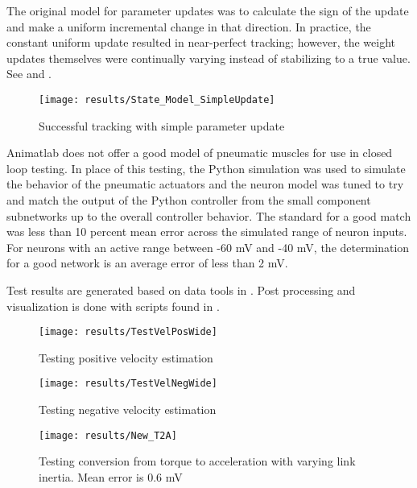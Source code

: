 
The original model for parameter updates was to calculate the sign of the update
and make a uniform incremental change in that direction. In practice, the constant uniform update
resulted in near-perfect tracking; however, the weight updates themselves were continually varying instead of stabilizing to a true value. See  and .

\begin{figure}
\centering
\texttt{[image: results/State\_Model\_SimpleUpdate]}
\caption{Successful tracking with simple parameter update}
\label{fig:StateUpdateSimple}
\end{figure}


Animatlab does not offer a good model of pneumatic muscles for use in closed loop testing. In place of this testing, the Python simulation was used to simulate the behavior of the pneumatic actuators and the neuron model was tuned to try and match the output of the Python controller from the small component subnetworks up to the overall controller behavior. The standard for a good match was less than 10 percent mean error across the simulated range of neuron inputs. For neurons with an active range between -60 mV and -40 mV, the determination for a good network is an average error of less than 2 mV.


Test results are generated based on data tools in . Post processing and visualization is done with scripts found in .

\begin{figure}
\centering
\texttt{[image: results/TestVelPosWide]}
\caption{Testing positive velocity estimation}
\label{fig:TestVelPos}
\end{figure}

\begin{figure}
\centering
\texttt{[image: results/TestVelNegWide]}
\caption{Testing negative velocity estimation}
\label{fig:TestVelNeg}
\end{figure}

\begin{figure}
\centering
\texttt{[image: results/New\_T2A]}
\caption{Testing conversion from torque to acceleration with varying link inertia. Mean error is 0.6 mV}
\label{fig:TestAccelInertia}
\end{figure}

